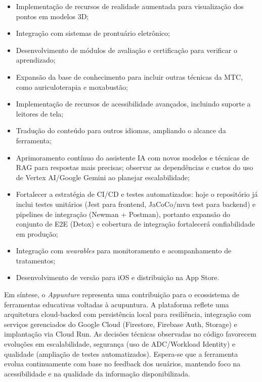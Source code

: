 \begin{itemize}
    \item Implementação de recursos de realidade aumentada para visualização dos pontos em modelos 3D;
    \item Integração com sistemas de prontuário eletrônico;
    \item Desenvolvimento de módulos de avaliação e certificação para verificar o aprendizado;
    \item Expansão da base de conhecimento para incluir outras técnicas da MTC, como auriculoterapia e moxabustão;
    \item Implementação de recursos de acessibilidade avançados, incluindo suporte a leitores de tela;
    \item Tradução do conteúdo para outros idiomas, ampliando o alcance da ferramenta;
    \item Aprimoramento contínuo do assistente IA com novos modelos e técnicas de RAG para respostas mais precisas; observar as dependências e custos do uso de Vertex AI/Google Gemini ao planejar escalabilidade;
    \item Fortalecer a estratégia de CI/CD e testes automatizados: hoje o repositório já inclui testes unitários (Jest para frontend, JaCoCo/mvn test para backend) e pipelines de integração (Newman + Postman), portanto expansão do conjunto de E2E (Detox) e cobertura de integração fortalecerá confiabilidade em produção;
    \item Integração com \textit{wearables} para monitoramento e acompanhamento de tratamentos;
    \item Desenvolvimento de versão para iOS e distribuição na App Store.
\end{itemize}

Em síntese, o \textit{Appunture} representa uma contribuição para o ecossistema de ferramentas educativas voltadas à acupuntura. A plataforma reflete uma arquitetura cloud-backed com persistência local para resiliência, integração com serviços gerenciados do Google Cloud (Firestore, Firebase Auth, Storage) e implantação via Cloud Run. As decisões técnicas observadas no código favorecem evoluções em escalabilidade, segurança (uso de ADC/Workload Identity) e qualidade (ampliação de testes automatizados). Espera-se que a ferramenta evolua continuamente com base no feedback dos usuários, mantendo foco na acessibilidade e na qualidade da informação disponibilizada.

